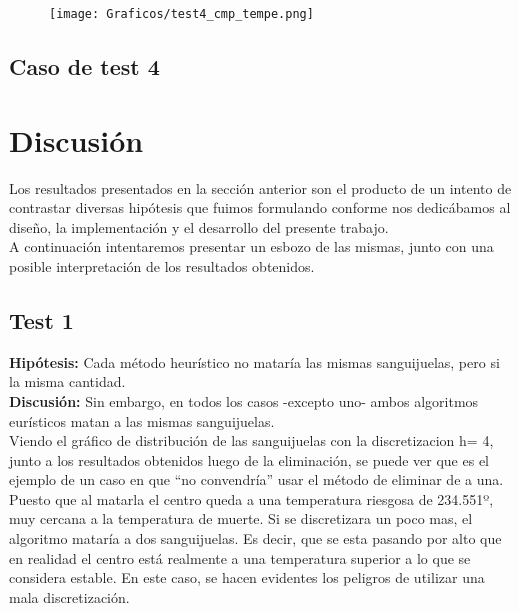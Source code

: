 \documentclass[double, 1.5in, 12pt]{beavtex}
\begin{document}
\begin{figure}[H]
\begin{center}
	\texttt{[image: Graficos/test4\_cmp\_tempe.png]}
	\caption{}
	\label{fig:frog}
	\end{center}
\end{figure}

\section{Caso de test 4}



\chapter{Discusi\'on}

Los resultados presentados en la secci\'on anterior son el producto de un intento de contrastar  diversas hip\'otesis que fuimos formulando conforme nos dedic\'abamos al diseño, la implementaci\'on y el desarrollo del presente trabajo. \\
A continuaci\'on intentaremos presentar un esbozo de las mismas, junto con una posible interpretaci\'on de los resultados obtenidos. \\




\section{Test 1}
\textbf{Hip\'otesis:} Cada m\'etodo heur\'istico no matar\'ia las mismas sanguijuelas, pero si la misma cantidad. \\
\textbf{Discusi\'on:} Sin embargo, en todos los casos -excepto uno- ambos algoritmos eur\'isticos matan a las mismas sanguijuelas.  \\
Viendo el gr\'afico de distribuci\'on de las sanguijuelas con la discretizacion h= 4, junto a los resultados obtenidos luego de la eliminaci\'on, se puede ver que es el ejemplo de un caso en que “no convendr\'ia” usar el m\'etodo de eliminar de a una. Puesto que al matarla el centro queda a una temperatura riesgosa de 234.551º, muy cercana a la temperatura de muerte. Si se discretizara un poco mas, el algoritmo matar\'ia a dos sanguijuelas. Es decir, que se esta pasando por alto que en realidad el centro est\'a realmente a una temperatura superior a lo que se considera estable. En este caso, se hacen evidentes los peligros de utilizar una mala discretizaci\'on.  \\
\end{document}
